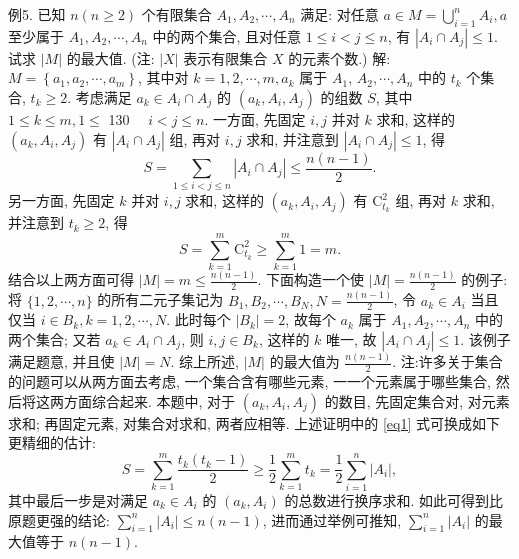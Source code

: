 例5. 已知 $n(n \geqslant 2)$ 个有限集合 $A_1, A_2, \cdots, A_n$ 满足: 对任意 $a \in M= \bigcup_{i=1}^n A_i, a$ 至少属于 $A_1, A_2, \cdots, A_n$ 中的两个集合, 且对任意 $1 \leqslant i<j \leqslant n$, 有 $\left|A_i \cap A_j\right| \leqslant 1$. 试求 $|M|$ 的最大值.
(注: $|X|$ 表示有限集合 $X$ 的元素个数.)
解: $M=\left\{a_1, a_2, \cdots, a_m\right\}$, 其中对 $k=1,2, \cdots, m, a_k$ 属于 $A_1$, $A_2, \cdots, A_n$ 中的 $t_k$ 个集合, $t_k \geqslant 2$.
考虑满足 $a_k \in A_i \cap A_j$ 的 $\left(a_k, A_i, A_j\right)$ 的组数 $S$, 其中 $1 \leqslant k \leqslant m, 1 \leqslant$ 130 $\quad i<j \leqslant n$.
一方面, 先固定 $i, j$ 并对 $k$ 求和, 这样的 $\left(a_k, A_i, A_j\right)$ 有 $\left|A_i \cap A_j\right|$ 组, 再对 $i, j$ 求和, 并注意到 $\left|A_i \cap A_j\right| \leqslant 1$, 得
$$
S=\sum_{1 \leqslant i<j \leqslant n}\left|A_i \cap A_j\right| \leqslant \frac{n(n-1)}{2} .
$$
另一方面, 先固定 $k$ 并对 $i, j$ 求和, 这样的 $\left(a_k, A_i, A_j\right)$ 有 $\mathrm{C}_{t_k}^2$ 组, 再对 $k$ 求和, 并注意到 $t_k \geqslant 2$, 得
$$
S=\sum_{k=1}^m \mathrm{C}_{t_k}^2 \geqslant \sum_{k=1}^m 1=m . \label{eq1}
$$
结合以上两方面可得 $|M|=m \leqslant \frac{n(n-1)}{2}$.
下面构造一个使 $|M|=\frac{n(n-1)}{2}$ 的例子:
将 $\{1,2, \cdots, n\}$ 的所有二元子集记为 $B_1, B_2, \cdots, B_N, N=\frac{n(n-1)}{2}$, 令 $a_k \in A_i$ 当且仅当 $i \in B_k, k=1,2, \cdots, N$. 此时每个 $\left|B_k\right|=2$, 故每个 $a_k$ 属于 $A_1, A_2, \cdots, A_n$ 中的两个集合; 又若 $a_k \in A_i \cap A_j$, 则 $i, j \in B_k$, 这样的
$k$ 唯一, 故 $\left|A_i \cap A_j\right| \leqslant 1$. 该例子满足题意, 并且使 $|M|=N$.
综上所述, $|M|$ 的最大值为 $\frac{n(n-1)}{2}$.
注:许多关于集合的问题可以从两方面去考虑, 一个集合含有哪些元素, 一一个元素属于哪些集合, 然后将这两方面综合起来.
本题中, 对于 $\left(a_k, A_i, A_j\right)$  的数目, 先固定集合对, 对元素求和; 再固定元素, 对集合对求和, 两者应相等.
上述证明中的 \ref{eq1} 式可换成如下更精细的估计:
$$
S=\sum_{k=1}^m \frac{t_k\left(t_k-1\right)}{2} \geqslant \frac{1}{2} \sum_{k=1}^m t_k=\frac{1}{2} \sum_{i=1}^n\left|A_i\right|,
$$
其中最后一步是对满足 $a_k \in A_i$ 的 $\left(a_k, A_i\right)$ 的总数进行换序求和.
如此可得到比原题更强的结论: $\sum_{i=1}^n\left|A_i\right| \leqslant n(n-1)$, 进而通过举例可推知, $\sum_{i=1}^n\left|A_i\right|$ 的最大值等于 $n(n-1)$.



